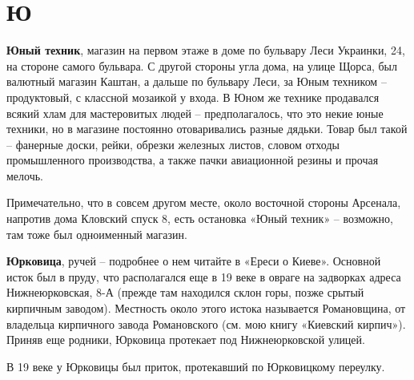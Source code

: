 \chapter*{Ю}


\textbf{Юный техник}, магазин на первом этаже в доме по бульвару Леси Украинки, 24, на стороне самого бульвара. С другой стороны угла дома, на улице Щорса, был валютный магазин Каштан, а дальше по бульвару Леси, за Юным техником – продуктовый, с классной мозаикой у входа. В Юном же технике продавался всякий хлам для мастеровитых людей – предполагалось, что это некие юные техники, но в магазине постоянно отоваривались разные дядьки. Товар был такой – фанерные доски, рейки, обрезки железных листов, словом отходы промышленного производства, а также пачки авиационной резины и прочая мелочь.

Примечательно, что в совсем другом месте, около восточной стороны Арсенала, напротив дома Кловский спуск 8, есть остановка «Юный техник» – возможно, там тоже был одноименный магазин.\\

\medskip

\textbf{Юрковица}, ручей – подробнее о нем читайте в «Ереси о Киеве». Основной исток был в пруду, что располагался еще в 19 веке в овраге на задворках адреса Нижнеюрковская, 8-А (прежде там находился склон горы, позже срытый кирпичным заводом). Местность около этого истока называется Романовщина, от владельца кирпичного завода Романовского (см. мою книгу «Киевский кирпич»). Приняв еще родники, Юрковица протекает под Нижнеюрковской улицей.

В 19 веке у Юрковицы был приток, протекавший по Юрковицкому переулку.
